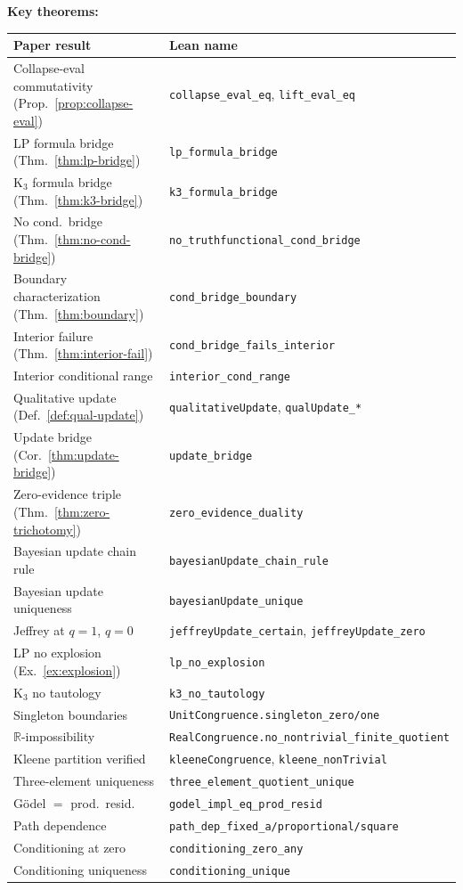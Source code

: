 \documentclass[11pt,a4paper]{article}
\newcommand{\Real}{\mathbb{R}}
\begin{document}
\textbf{Key theorems:}
\begin{center}
\small
\begin{tabular}{ll}
\toprule
\textbf{Paper result} & \textbf{Lean name} \\
\midrule
Collapse-eval commutativity (Prop.~\ref{prop:collapse-eval})
  & \texttt{collapse\_eval\_eq}, \texttt{lift\_eval\_eq} \\
LP formula bridge (Thm.~\ref{thm:lp-bridge})
  & \texttt{lp\_formula\_bridge} \\
K$_3$ formula bridge (Thm.~\ref{thm:k3-bridge})
  & \texttt{k3\_formula\_bridge} \\
No cond.\ bridge (Thm.~\ref{thm:no-cond-bridge})
  & \texttt{no\_truthfunctional\_cond\_bridge} \\
Boundary characterization (Thm.~\ref{thm:boundary})
  & \texttt{cond\_bridge\_boundary} \\
Interior failure (Thm.~\ref{thm:interior-fail})
  & \texttt{cond\_bridge\_fails\_interior} \\
Interior conditional range
  & \texttt{interior\_cond\_range} \\
Qualitative update (Def.~\ref{def:qual-update})
  & \texttt{qualitativeUpdate}, \texttt{qualUpdate\_*} \\
Update bridge (Cor.~\ref{thm:update-bridge})
  & \texttt{update\_bridge} \\
Zero-evidence triple (Thm.~\ref{thm:zero-trichotomy})
  & \texttt{zero\_evidence\_duality} \\
Bayesian update chain rule
  & \texttt{bayesianUpdate\_chain\_rule} \\
Bayesian update uniqueness
  & \texttt{bayesianUpdate\_unique} \\
Jeffrey at $q=1$, $q=0$
  & \texttt{jeffreyUpdate\_certain}, \texttt{jeffreyUpdate\_zero} \\
LP no explosion (Ex.~\ref{ex:explosion})
  & \texttt{lp\_no\_explosion} \\
K$_3$ no tautology
  & \texttt{k3\_no\_tautology} \\
Singleton boundaries
  & \texttt{UnitCongruence.singleton\_zero/one} \\
$\Real$-impossibility
  & \texttt{RealCongruence.no\_nontrivial\_finite\_quotient} \\
Kleene partition verified
  & \texttt{kleeneCongruence}, \texttt{kleene\_nonTrivial} \\
Three-element uniqueness
  & \texttt{three\_element\_quotient\_unique} \\
G\"odel $=$ prod.\ resid.
  & \texttt{godel\_impl\_eq\_prod\_resid} \\
Path dependence
  & \texttt{path\_dep\_fixed\_a/proportional/square} \\
Conditioning at zero
  & \texttt{conditioning\_zero\_any} \\
Conditioning uniqueness
  & \texttt{conditioning\_unique} \\
\bottomrule
\end{tabular}
\normalsize
\end{center}
\end{document}
